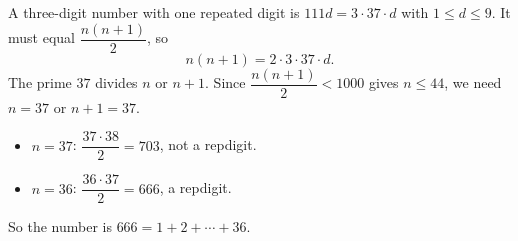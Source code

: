 A three-digit number with one repeated digit is $111d=3\cdot37\cdot d$ with $1\le d\le9$. It must equal $\dfrac{n(n+1)}{2}$, so
\[
n(n+1)=2\cdot3\cdot37\cdot d .
\]
The prime $37$ divides $n$ or $n+1$. Since $\dfrac{n(n+1)}{2}<1000$ gives $n\le44$, we need $n=37$ or $n+1=37$.
\begin{itemize}
\item $n=37$: $\dfrac{37\cdot38}{2}=703$, not a repdigit.
\item $n=36$: $\dfrac{36\cdot37}{2}=666$, a repdigit.
\end{itemize}
So the number is $\boxed{666}=1+2+\cdots+36$.
